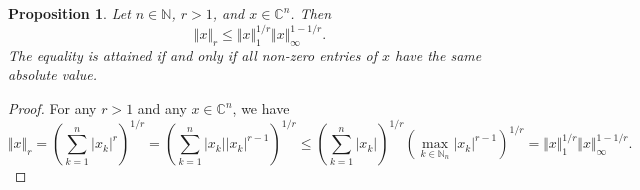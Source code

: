\documentclass[12pt]{article}
\newtheorem{proposition}[theorem]{Proposition}
\begin{document}
\begin{proposition}\label{SpclLyapIneq}
    Let $n\in\mathbb{N}$, $r>1$, and $x\in\mathbb{C}^n$. Then
    \[
        \Vert x\Vert_r\leq \Vert x\Vert_1^{1/r}\Vert x\Vert_\infty^{1-1/r}.
    \]
    The equality is attained if and only if all non-zero entries of $x$ have the
    same absolute value.
\end{proposition}
\begin{proof}
    For any $r>1$ and any $x\in\mathbb{C}^n$, we have
    \[
        \Vert x\Vert_r
        =\left(\sum_{k=1}^n |x_k|^r \right)^{1/r}
        =\left(\sum_{k=1}^n |x_k| |x_k|^{r-1} \right)^{1/r}
        \leq\left(\sum_{k=1}^n |x_k| \right)^{1/r} 
        \left(\max\limits_{k\in\mathbb{N}_n}|x_k|^{r-1}\right)^{1/r}
        =\Vert x\Vert_1^{1/r}\Vert x\Vert_\infty^{1-1/r}.
    \]
\end{proof}
\end{document}
